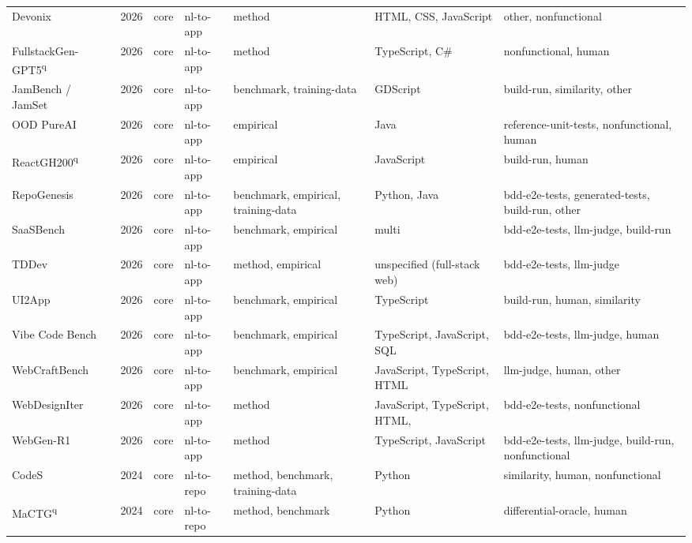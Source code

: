 {\begin{longtable}{@{}p{2.8cm}lllp{1.9cm}p{1.5cm}p{2.9cm}@{}}
Devonix~\cite{Devonix2026} & 2026 & core & nl-to-app & method & HTML, CSS, JavaScript & other, nonfunctional \\
FullstackGen-GPT5\textsuperscript{q}~\cite{FullstackGenGPT52026} & 2026 & core & nl-to-app & method & TypeScript, C\# & nonfunctional, human \\
JamBench / JamSet~\cite{JamBenchJamSet2026} & 2026 & core & nl-to-app & benchmark, training-data & GDScript & build-run, similarity, other \\
OOD PureAI~\cite{OODPureAI2026} & 2026 & core & nl-to-app & empirical & Java & reference-unit-tests, nonfunctional, human \\
ReactGH200\textsuperscript{q}~\cite{ReactGH2002026} & 2026 & core & nl-to-app & empirical & JavaScript & build-run, human \\
RepoGenesis~\cite{RepoGenesis2026} & 2026 & core & nl-to-app & benchmark, empirical, training-data & Python, Java & bdd-e2e-tests, generated-tests, build-run, other \\
SaaSBench~\cite{SaaSBench2026} & 2026 & core & nl-to-app & benchmark, empirical & multi & bdd-e2e-tests, llm-judge, build-run \\
TDDev~\cite{TDDev2026} & 2026 & core & nl-to-app & method, empirical & unspecified (full-stack web) & bdd-e2e-tests, llm-judge \\
UI2App~\cite{UI2App2026} & 2026 & core & nl-to-app & benchmark, empirical & TypeScript & build-run, human, similarity \\
Vibe Code Bench~\cite{VibeCodeBench2026} & 2026 & core & nl-to-app & benchmark, empirical & TypeScript, JavaScript, SQL & bdd-e2e-tests, llm-judge, human \\
WebCraftBench~\cite{WebCraftBench2026} & 2026 & core & nl-to-app & benchmark, empirical & JavaScript, TypeScript, HTML & llm-judge, human, other \\
WebDesignIter~\cite{WebDesignIter2026} & 2026 & core & nl-to-app & method & JavaScript, TypeScript, HTML,  & bdd-e2e-tests, nonfunctional \\
WebGen-R1~\cite{WebGenR12026} & 2026 & core & nl-to-app & method & TypeScript, JavaScript & bdd-e2e-tests, llm-judge, build-run, nonfunctional \\
CodeS~\cite{CodeS2024} & 2024 & core & nl-to-repo & method, benchmark, training-data & Python & similarity, human, nonfunctional \\
MaCTG\textsuperscript{q}~\cite{MaCTG2024} & 2024 & core & nl-to-repo & method, benchmark & Python & differential-oracle, human \\

\end{longtable}}
